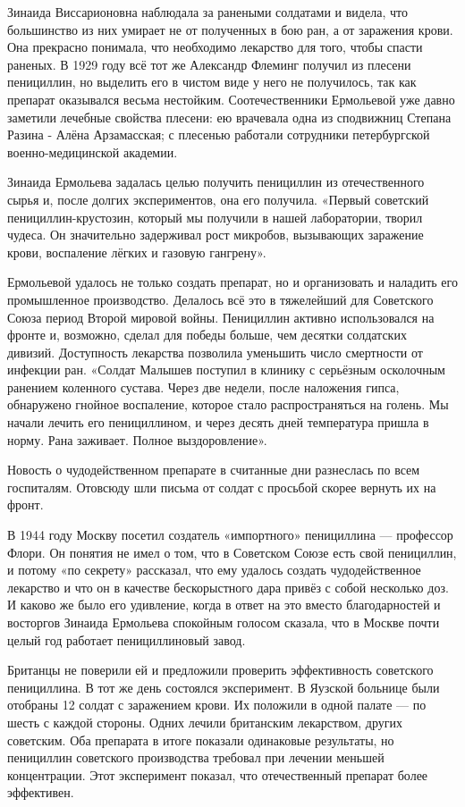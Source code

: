 Зинаида Виссарионовна наблюдала за ранеными солдатами и видела, что большинство
из них умирает не от полученных в бою ран, а от заражения крови. Она прекрасно
понимала, что необходимо лекарство для того, чтобы спасти раненых. В 1929 году
всё тот же Александр Флеминг получил из плесени пенициллин, но выделить его в
чистом виде у него не получилось, так как препарат оказывался весьма нестойким.
Соотечественники Ермольевой уже давно заметили лечебные свойства плесени: ею
врачевала одна из сподвижниц Степана Разина - Алёна Арзамасская; с плесенью
работали сотрудники петербургской военно-медицинской академии.

Зинаида Ермольева задалась целью получить пенициллин из отечественного сырья и,
после долгих экспериментов, она его получила. «Первый советский
пенициллин-крустозин, который мы получили в нашей лаборатории, творил чудеса.
Он значительно задерживал рост микробов, вызывающих заражение крови, воспаление
лёгких и газовую гангрену».

Ермольевой удалось не только создать препарат, но и организовать и наладить его
промышленное производство. Делалось всё это в тяжелейший для Советского Союза
период Второй мировой войны. Пенициллин активно использовался на фронте и,
возможно, сделал для победы больше, чем десятки солдатских дивизий. Доступность
лекарства позволила уменьшить число смертности от инфекции ран. «Солдат Малышев
поступил в клинику с серьёзным осколочным ранением коленного сустава. Через две
недели, после наложения гипса, обнаружено гнойное воспаление, которое стало
распространяться на голень. Мы начали лечить его пенициллином, и через десять
дней температура пришла в норму. Рана заживает. Полное выздоровление».

Новость о чудодейственном препарате в считанные дни разнеслась по всем
госпиталям. Отовсюду шли письма от солдат с просьбой скорее вернуть их на
фронт.

В 1944 году Москву посетил создатель «импортного» пенициллина --- профессор
Флори. Он понятия не имел о том, что в Советском Союзе есть свой пенициллин, и
потому «по секрету» рассказал, что ему удалось создать чудодейственное
лекарство и что он в качестве бескорыстного дара привёз с собой несколько доз.
И каково же было его удивление, когда в ответ на это вместо благодарностей и
восторгов Зинаида Ермольева спокойным голосом сказала, что в Москве почти целый
год работает пенициллиновый завод.

Британцы не поверили ей и предложили проверить эффективность советского
пенициллина. В тот же день состоялся эксперимент. В Яузской больнице были
отобраны 12 солдат с заражением крови. Их положили в одной палате --- по шесть с
каждой стороны. Одних лечили британским лекарством, других советским. Оба
препарата в итоге показали одинаковые результаты, но пенициллин советского
производства требовал при лечении меньшей концентрации. Этот эксперимент
показал, что отечественный препарат более эффективен.

